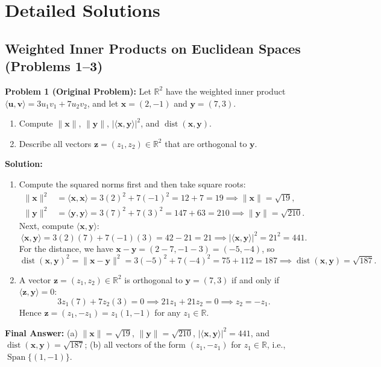 \documentclass[11pt, letterpaper]{article}
\theoremstyle{definition}
\theoremstyle{remark}
\begin{document}
\newpage

\section{Detailed Solutions}

\subsection{Weighted Inner Products on Euclidean Spaces (Problems 1--3)}

\textbf{Problem 1 (Original Problem):} Let $\mathbb{R}^2$ have the weighted inner product $\langle \mathbf{u}, \mathbf{v} \rangle = 3u_1v_1 + 7u_2v_2$, and let $\mathbf{x} = (2, -1)$ and $\mathbf{y} = (7, 3)$.
\begin{enumerate}[label=(\alph*)]
    \item Compute $\|\mathbf{x}\|$, $\|\mathbf{y}\|$, $|\langle \mathbf{x}, \mathbf{y} \rangle|^2$, and $\operatorname{dist}(\mathbf{x}, \mathbf{y})$.
    \item Describe all vectors $\mathbf{z} = (z_1, z_2) \in \mathbb{R}^2$ that are orthogonal to $\mathbf{y}$.
\end{enumerate}

\textbf{Solution:}
\begin{enumerate}[label=(\alph*)]
    \item Compute the squared norms first and then take square roots:
    \begin{align*}
    \|\mathbf{x}\|^2 &= \langle \mathbf{x}, \mathbf{x} \rangle = 3(2)^2 + 7(-1)^2 = 12 + 7 = 19 \implies \|\mathbf{x}\| = \sqrt{19}, \\
    \|\mathbf{y}\|^2 &= \langle \mathbf{y}, \mathbf{y} \rangle = 3(7)^2 + 7(3)^2 = 147 + 63 = 210 \implies \|\mathbf{y}\| = \sqrt{210}.
    \end{align*}
    Next, compute $\langle \mathbf{x}, \mathbf{y} \rangle$:
    \[
    \langle \mathbf{x}, \mathbf{y} \rangle = 3(2)(7) + 7(-1)(3) = 42 - 21 = 21 \implies |\langle \mathbf{x}, \mathbf{y} \rangle|^2 = 21^2 = 441.
    \]
    For the distance, we have $\mathbf{x} - \mathbf{y} = (2 - 7, -1 - 3) = (-5, -4)$, so
    \[
    \operatorname{dist}(\mathbf{x}, \mathbf{y})^2 = \|\mathbf{x} - \mathbf{y}\|^2 = 3(-5)^2 + 7(-4)^2 = 75 + 112 = 187 \implies \operatorname{dist}(\mathbf{x}, \mathbf{y}) = \sqrt{187}.
    \]
    \item A vector $\mathbf{z} = (z_1, z_2) \in \mathbb{R}^2$ is orthogonal to $\mathbf{y} = (7, 3)$ if and only if $\langle \mathbf{z}, \mathbf{y} \rangle = 0$:
    \[
    3z_1(7) + 7z_2(3) = 0 \implies 21z_1 + 21z_2 = 0 \implies z_2 = -z_1.
    \]
    Hence $\mathbf{z} = (z_1, -z_1) = z_1(1, -1)$ for any $z_1 \in \mathbb{R}$.
\end{enumerate}
\textbf{Final Answer:} (a) $\|\mathbf{x}\| = \sqrt{19}$, $\|\mathbf{y}\| = \sqrt{210}$, $|\langle \mathbf{x}, \mathbf{y} \rangle|^2 = 441$, and $\operatorname{dist}(\mathbf{x}, \mathbf{y}) = \sqrt{187}$; (b) all vectors of the form $(z_1, -z_1)$ for $z_1 \in \mathbb{R}$, i.e., $\operatorname{Span}\{(1, -1)\}$.
\end{document}
